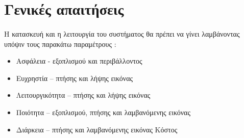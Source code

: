 \documentclass[a4paper, 12pt, twoside]{report}
\begin{document}
		\section{Γενικές απαιτήσεις}
			\paragraph{}{Η κατασκευή και η λειτουργία του συστήματος θα πρέπει να γίνει λαμβάνοντας υπόψιν τους παρακάτω παραμέτρους :
				\begin{itemize}
					\item Ασφάλεια - εξοπλισμού και περιβάλλοντος
					\item Ευχρηστία – πτήσης και λήψης εικόνας
					\item Λειτουργικότητα – πτήσης και λήψης εικόνας
					\item Ποιότητα – εξοπλισμού, πτήσης και λαμβανόμενης εικόνας
					\item Διάρκεια – πτήσης και λαμβανόμενης εικόνας
Κόστος
				\end{itemize}
			}
			
\end{document}
